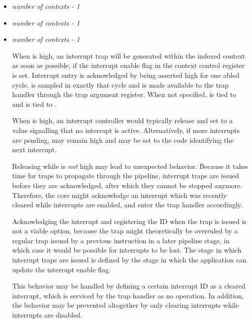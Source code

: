 \documentclass[main.tex]{subfiles}
\begin{document}
\begin{itemize}

  \item {}\textit{number of contexts - 1}
  \item {}\textit{number of contexts - 1}
  \item {}\textit{number of contexts - 1}
  
  When  is high, an interrupt trap will be generated within the indexed context as soon as possible, if the interrupt enable flag in the context control register is set. Interrupt entry is acknowledged by  being asserted high for one abled cycle.  is sampled in exactly that cycle and is made available to the trap handler through the trap argument register. When not specified,  is tied to  and  is tied to .
  
  When  is high, an interrupt controller would typically release  and set  to a value signalling that no interrupt is active. Alternatively, if more interrupts are pending,  may remain high and  may be set to the code identifying the next interrupt.
  
  Releasing  while  is \textit{not} high may lead to unexpected behavior. Because it takes time for traps to propagate through the pipeline, interrupt traps are issued before they are acknowledged, after which they cannot be stopped anymore. Therefore, the core might acknowledge an interrupt which was recently cleared while interrupts are enabled, and enter the trap handler accordingly.
  
  Acknowledging the interrupt and registering the ID when the trap is issued is not a viable option, because the trap might theoretically be overruled by a regular trap issued by a previous instruction in a later pipeline stage, in which case it would be possible for interrupts to be lost. The stage in which interrupt traps are issued is defined by the stage in which the application can update the interrupt enable flag.
  
  This behavior may be handled by defining a certain interrupt ID as a cleared interrupt, which is serviced by the trap handler as no operation. In addition, the behavior may be prevented altogether by only clearing interrupts while interrupts are disabled.
  

\end{itemize}
\end{document}
